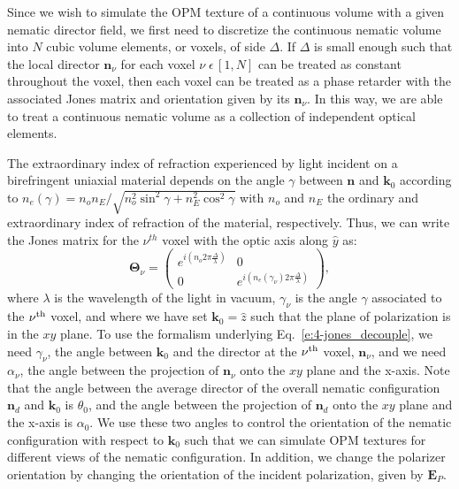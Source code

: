 Since we wish to simulate the OPM texture of a continuous volume with a given nematic director field, we first need to discretize the continuous nematic volume into $N$ cubic volume elements, or voxels, of side $\Delta$.
If $\Delta$ is small enough such that the local director $\mathbf{n}_{\nu}$ for each voxel $ \nu \;\epsilon \, [1,N]$ can be treated as constant throughout the voxel, then each voxel can be treated as a phase retarder with the associated Jones matrix and orientation given by its $\mathbf{n}_{\nu}$.
In this way, we are able to treat a continuous nematic volume as a collection of independent optical elements.

The extraordinary index of refraction experienced by light incident on a birefringent uniaxial material depends on the angle $\gamma$ between $\mathbf{n}$ and $\mathbf{k}_0$ according to $n_e(\gamma) = n_o n_E/\sqrt{n^2_o \sin^2\gamma+n_E^2 \cos^2 \gamma}$ with $n_o$ and $n_E$ the ordinary and extraordinary index of refraction of the material, respectively.
Thus, we can write the Jones matrix for the $\nu^{th}$ voxel with the optic axis along $\hat{y}$ as:
\begin{equation}
\bm{\Theta}_{\nu}  =  \begin{pmatrix}e^{i\left( n_o2 \pi \frac{\Delta}{\lambda}\right )} & 0 \\ 0 & e^{i \left (n_e (\gamma_{\nu})2 \pi \frac{\Delta}{\lambda}\right )} \end{pmatrix},
\end{equation}
where $\lambda$ is the wavelength of the light in vacuum, $\gamma_{\nu}$ is the angle $\gamma$ associated to the $\nu^{\rm th}$ voxel, and where we have set $\mathbf{k}_0=\hat{z}$ such that the plane of polarization is in the $xy$ plane.
To use the formalism underlying Eq.~\ref{e:4-jones_decouple}, we need $\gamma_{\nu}$, the angle between $\mathbf{k}_0$ and  the director at the $\nu^{\rm th}$ voxel, $\mathbf{n}_{\nu}$, and we need $\alpha_{\nu}$, the angle between the projection of $\mathbf{n}_{\nu}$ onto the $xy$ plane and the x-axis.
Note that the angle between the average director of the overall nematic configuration $\mathbf{n}_d$ and $\mathbf{k}_0$ is $\theta_0$, and the angle between the projection of $\mathbf{n}_d$ onto the $xy$ plane and the x-axis is $\alpha_0$.
We use these two angles to control the orientation of the nematic configuration with respect to $\mathbf{k}_0$ such that we can simulate OPM textures for different views of the nematic configuration.
In addition, we change the polarizer orientation by changing the orientation of the incident polarization, given by $\mathbf{E}_P$.
